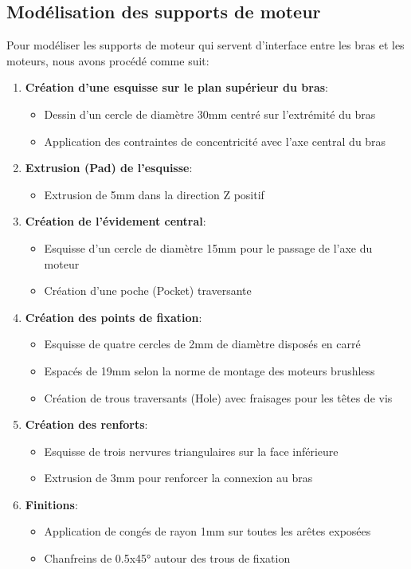 \documentclass[a4paper,12pt]{report}
\begin{document}
\subsection{Modélisation des supports de moteur}
Pour modéliser les supports de moteur qui servent d'interface entre les bras et les moteurs, nous avons procédé comme suit:
\begin{enumerate}
    \item \textbf{Création d'une esquisse sur le plan supérieur du bras}:
    \begin{itemize}
        \item Dessin d'un cercle de diamètre 30mm centré sur l'extrémité du bras
        \item Application des contraintes de concentricité avec l'axe central du bras
    \end{itemize}
    
    \item \textbf{Extrusion (Pad) de l'esquisse}:
    \begin{itemize}
        \item Extrusion de 5mm dans la direction Z positif
    \end{itemize}
    
    \item \textbf{Création de l'évidement central}:
    \begin{itemize}
        \item Esquisse d'un cercle de diamètre 15mm pour le passage de l'axe du moteur
        \item Création d'une poche (Pocket) traversante
    \end{itemize}
    
    \item \textbf{Création des points de fixation}:
    \begin{itemize}
        \item Esquisse de quatre cercles de 2mm de diamètre disposés en carré
        \item Espacés de 19mm selon la norme de montage des moteurs brushless
        \item Création de trous traversants (Hole) avec fraisages pour les têtes de vis
    \end{itemize}
    
    \item \textbf{Création des renforts}:
    \begin{itemize}
        \item Esquisse de trois nervures triangulaires sur la face inférieure
        \item Extrusion de 3mm pour renforcer la connexion au bras
    \end{itemize}
    
    \item \textbf{Finitions}:
    \begin{itemize}
        \item Application de congés de rayon 1mm sur toutes les arêtes exposées
        \item Chanfreins de 0.5x45° autour des trous de fixation
    \end{itemize}
\end{enumerate}
\end{document}
